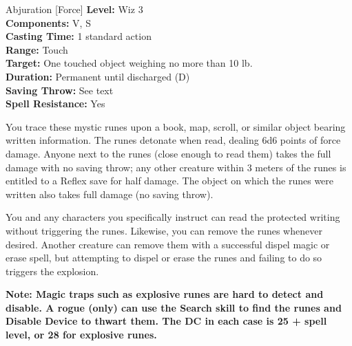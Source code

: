 {Abjuration [Force]}
{
	\textbf{Level:}
	Wiz 3\\
	\textbf{Components:}
	V, S\\
	\textbf{Casting Time:}
	1 standard action\\
	\textbf{Range:}
	Touch\\
	\textbf{Target:}
	One touched object weighing no more than 10 lb.\\
	\textbf{Duration:}
	Permanent until discharged (D)\\
	\textbf{Saving Throw:}
	See text\\
	\textbf{Spell Resistance:}
	Yes\\
}
{
	You trace these mystic runes upon a book, map, scroll, or similar object bearing written information. The runes detonate when read, dealing 6d6 points of force damage. Anyone next to the runes (close enough to read them) takes the full damage with no saving throw; any other creature within 3 meters of the runes is entitled to a Reflex save for half damage. The object on which the runes were written also takes full damage (no saving throw).

	You and any characters you specifically instruct can read the protected writing without triggering the runes. Likewise, you can remove the runes whenever desired. Another creature can remove them with a successful dispel magic or erase spell, but attempting to dispel or erase the runes and failing to do so triggers the explosion.

	\textbf{Note: Magic traps such as explosive runes are hard to detect and disable. A rogue (only) can use the Search skill to find the runes and Disable Device to thwart them. The DC in each case is 25 + spell level, or 28 for explosive runes.}

}
